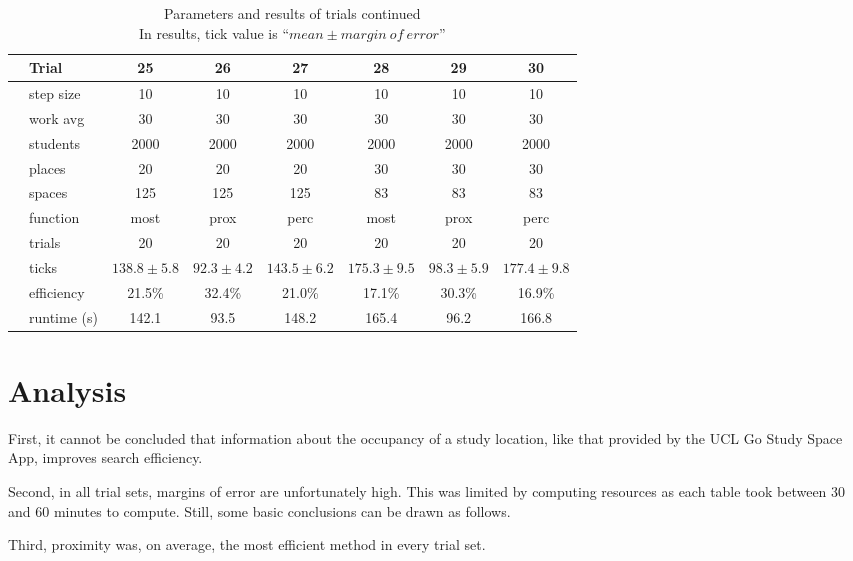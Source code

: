 \documentclass[11pt]{article} %
\begin{document}
\begin{table}[]
\footnotesize
\centering
\begin{tabular}{l|l|ccc|ccc}
 & Trial & 25 & 26 & 27 & 28 & 29 & 30  \\ \hline
  \parbox[t]{2mm}{} 
 & step size 	& 10  			& 10  			& 10 			& 10 					& 10 				& 10  \\
 & work avg 	& 30 			&  30 			& 30			& 30 					& 30 				& 30 \\
 & students 	& 2000 			& 2000 			& 2000 			& 2000 					& 2000 				& 2000 \\
 & places 		& 20 			& 20 			& 20 			& 30 					& 30 				& 30 \\
 & spaces 		& 125 			& 125 			& 125 			& 83 					& 83 				& 83 \\
 & function 	& most 			& prox 			& perc 			& most 					& prox 				& perc \\
 & trials 		& 20 			& 20 			& 20 			& 20 					& 20 				& 20 \\ \hline
\parbox[t]{2mm}{} 
 & ticks 		& $138.8\pm 5.8$ 	& $92.3\pm 4.2 $ 	& $ 143.5\pm 6.2 $	& $175.3\pm 9.5 $	& $98.3\pm 5.9 $	& $177.4\pm 9.8 $ \\
 & efficiency 	& 21.5\%		& 32.4\%		& 21.0\%			& 17.1\%		& 30.3\%		& 16.9\% \\
 & runtime (s) 	& 142.1		&	93.5		& 	148.2		& 165.4			& 96.2			& 166.8
\end{tabular}
\caption{Parameters and results of trials continued \\ \footnotesize In results, tick value is ``$mean \pm margin \: of \: error$''}
\end{table}

\section{Analysis}



First, it cannot be concluded that information about the occupancy of a study location, like that provided by the UCL Go Study Space App, improves search efficiency. 

Second, in all trial sets, margins of error are unfortunately high. This was limited by computing resources as each table took between 30 and 60 minutes to compute. Still, some basic conclusions can be drawn as follows. 

Third, proximity was, on average, the most efficient  method in every trial set. 
\end{document}

